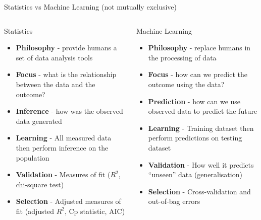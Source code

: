\documentclass[pdf]{beamer}
\begin{document}
\begin{frame}{Statistics vs Machine Learning (not mutually exclusive)}
\footnotesize %
\begin{columns}
\begin{block}{Statistics}
	\begin{itemize}\addtolength{\itemsep}{0.6\baselineskip}
		\item<2-> \textbf{Philosophy} - provide humans a set of data analysis tools 
		\item<3-> \textbf{Focus} - what is the relationship between the data and the outcome? %
		\item<4-> \textbf{Inference} - how was the observed data generated
		\item<5-> \textbf{Learning} - All measured data then perform inference on the population
		\item<6-> \textbf{Validation} - Measures of fit ($R^2$, chi-square test)
		\item<7-> \textbf{Selection} - Adjusted measures of fit (adjusted $R^2$, Cp statistic, AIC)
	\end{itemize}
\end{block}
\begin{block}{Machine Learning}
	\begin{itemize}\addtolength{\itemsep}{0.6\baselineskip}
		\item<2-> \textbf{Philosophy} - replace humans in the processing of data  
		\item<3-> \textbf{Focus} - how can we predict the outcome using the data? %
		\item<4-> \textbf{Prediction} - how can we use observed data to predict the future
		\item<5-> \textbf{Learning} - Training dataset then perform predictions on testing dataset
		\item<6-> \textbf{Validation} - How well it predicts ``unseen'' data (generalisation)
		\item<7-> \textbf{Selection} - Cross-validation and out-of-bag errors
	\end{itemize}
\end{block}
\end{columns}
\end{frame}
\end{document}
